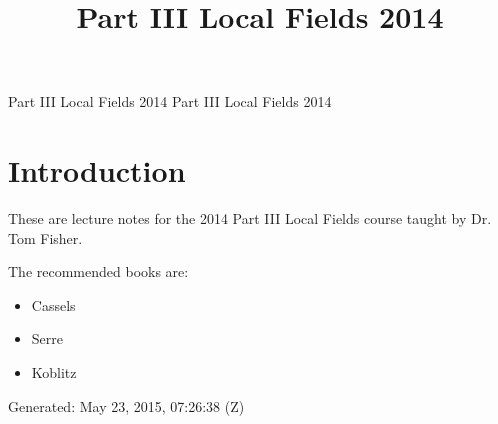 \documentclass[10pt,]{book}
\title{Part III Local Fields 2014}
\author{}
\date{}
\theoremstyle{plain}
\theoremstyle{definition}
\begin{document}
\frontmatter
\thispagestyle{empty}
{\centering
\vspace*{0.28\textheight}
{\Huge Part III Local Fields 2014}}
\clearpage
\thispagestyle{empty}
\null%
\clearpage
\thispagestyle{empty}
{\centering
\vspace*{0.14\textheight}
{\Huge Part III Local Fields 2014}\\[2\baselineskip]
}
\clearpage
\thispagestyle{empty}
\null\clearpage
\setcounter{tocdepth}{1}
\renewcommand*\contentsname{Contents}
\tableofcontents
\mainmatter
\typeout{************************************************}
\typeout{************************************************}
\chapter[Introduction]{Introduction}\label{chap-introduction}
These are lecture notes for the 2014 Part III Local Fields course taught by Dr. Tom Fisher.%
\par
The recommended books are:
        \begin{itemize}[label=\textbullet]
\item{}Cassels\item{}Serre\item{}Koblitz\end{itemize}

\par
Generated: May 23, 2015, 07:26:38 (Z)%
\typeout{************************************************}
\typeout{************************************************}
\end{document}
